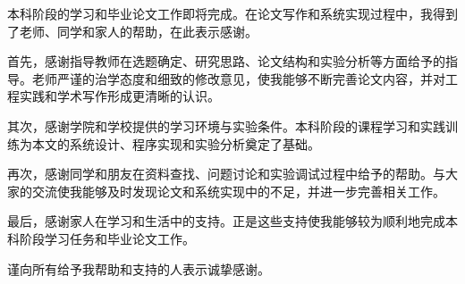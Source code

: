 \begin{newThanks}
本科阶段的学习和毕业论文工作即将完成。在论文写作和系统实现过程中，我得到了老师、同学和家人的帮助，在此表示感谢。

首先，感谢指导教师在选题确定、研究思路、论文结构和实验分析等方面给予的指导。老师严谨的治学态度和细致的修改意见，使我能够不断完善论文内容，并对工程实践和学术写作形成更清晰的认识。

其次，感谢学院和学校提供的学习环境与实验条件。本科阶段的课程学习和实践训练为本文的系统设计、程序实现和实验分析奠定了基础。

再次，感谢同学和朋友在资料查找、问题讨论和实验调试过程中给予的帮助。与大家的交流使我能够及时发现论文和系统实现中的不足，并进一步完善相关工作。

最后，感谢家人在学习和生活中的支持。正是这些支持使我能够较为顺利地完成本科阶段学习任务和毕业论文工作。

谨向所有给予我帮助和支持的人表示诚挚感谢。
\end{newThanks}
